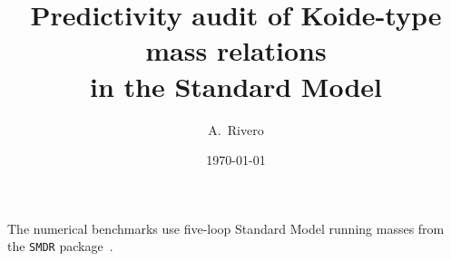\documentclass[aps,prd,twocolumn,superscriptaddress,nofootinbib]{revtex4-2}
\begin{document}
\title{Predictivity audit of Koide-type mass relations\\in the Standard Model}

\author{A.~Rivero}

\date{\today}

\begin{abstract}

\end{abstract}

\maketitle








\begin{acknowledgments}
The numerical benchmarks use five-loop Standard Model running masses
from the \texttt{SMDR} package~\cite{Martin:2019lqd}.
\end{acknowledgments}

\appendix




\end{document}
